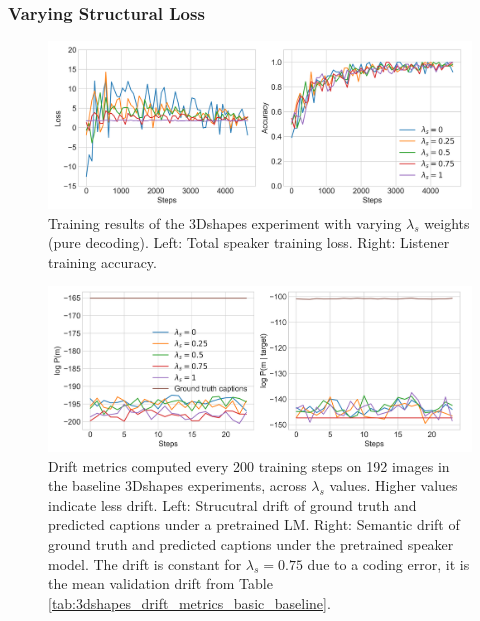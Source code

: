 \subsubsection{Varying Structural Loss}

\begin{figure}[h]
	\centering
	\includegraphics[width=\linewidth]{images/shapes_refgame_49_pure_losses_all_Ls_random.png}
	\caption{Training results of the 3Dshapes experiment with varying $\lambda_s$ weights (pure decoding). Left: Total speaker training loss. Right: Listener training accuracy.}
	\label{fig:3dshapes_baseline_speaker_loss_listener_acc_all}
\end{figure}

\begin{figure}[h]
	\centering
	\includegraphics[width=\linewidth]{images/shapes_structural_semantic_drift_49_pure_L_s_all_random.png}
	\caption{Drift metrics computed every 200 training steps on 192 images in the baseline 3Dshapes experiments, across $\lambda_s$ values. Higher values indicate less drift. Left: Strucutral drift of ground truth and predicted captions under a pretrained LM. Right: Semantic drift of ground truth and predicted captions under the pretrained speaker model. The drift is constant for $\lambda_s = 0.75$ due to a coding error, it is the mean validation drift from Table \ref{tab:3dshapes_drift_metrics_basic_baseline}.} 
	\label{fig:3dshapes_baseline_all_str_sem_drift}
\end{figure}

